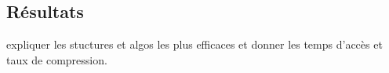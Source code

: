 %
%
%
%

\subsection{Résultats} 

expliquer les stuctures et algos les plus efficaces et donner les temps d'accès et taux de compression.
